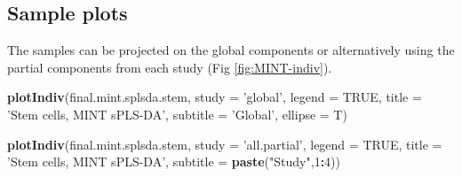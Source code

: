 \documentclass[]{book}
\newenvironment{Shaded}{\begin{snugshade}}{\end{snugshade}}
\newcommand{\CommentTok}[1]{\textcolor[rgb]{0.56,0.35,0.01}{\textit{#1}}}
\newcommand{\DataTypeTok}[1]{\textcolor[rgb]{0.13,0.29,0.53}{#1}}
\newcommand{\DecValTok}[1]{\textcolor[rgb]{0.00,0.00,0.81}{#1}}
\newcommand{\KeywordTok}[1]{\textcolor[rgb]{0.13,0.29,0.53}{\textbf{#1}}}
\newcommand{\NormalTok}[1]{#1}
\newcommand{\OperatorTok}[1]{\textcolor[rgb]{0.81,0.36,0.00}{\textbf{#1}}}
\newcommand{\OtherTok}[1]{\textcolor[rgb]{0.56,0.35,0.01}{#1}}
\newcommand{\StringTok}[1]{\textcolor[rgb]{0.31,0.60,0.02}{#1}}
\begin{document}
\begin{Shaded}
\end{Shaded}

\hypertarget{mint:result:ncomp}{%
\subsection{Sample plots}\label{mint:result:ncomp}}

The samples can be projected on the global components or alternatively using the partial components from each study (Fig \ref{fig:MINT-indiv}).

\begin{Shaded}
\begin{Highlighting}[]
\KeywordTok{plotIndiv}\NormalTok{(final.mint.splsda.stem, }\DataTypeTok{study =} \StringTok{'global'}\NormalTok{, }\DataTypeTok{legend =} \OtherTok{TRUE}\NormalTok{, }
          \DataTypeTok{title =} \StringTok{'Stem cells, MINT sPLS-DA'}\NormalTok{, }
          \DataTypeTok{subtitle =} \StringTok{'Global'}\NormalTok{, }\DataTypeTok{ellipse =}\NormalTok{ T)}
\end{Highlighting}
\end{Shaded}

\begin{Shaded}
\begin{Highlighting}[]
\KeywordTok{plotIndiv}\NormalTok{(final.mint.splsda.stem, }\DataTypeTok{study =} \StringTok{'all.partial'}\NormalTok{, }\DataTypeTok{legend =} \OtherTok{TRUE}\NormalTok{, }
          \DataTypeTok{title =} \StringTok{'Stem cells, MINT sPLS-DA'}\NormalTok{, }
          \DataTypeTok{subtitle =} \KeywordTok{paste}\NormalTok{(}\StringTok{"Study"}\NormalTok{,}\DecValTok{1}\OperatorTok{:}\DecValTok{4}\NormalTok{))}
\end{Highlighting}
\end{Shaded}
\end{document}

